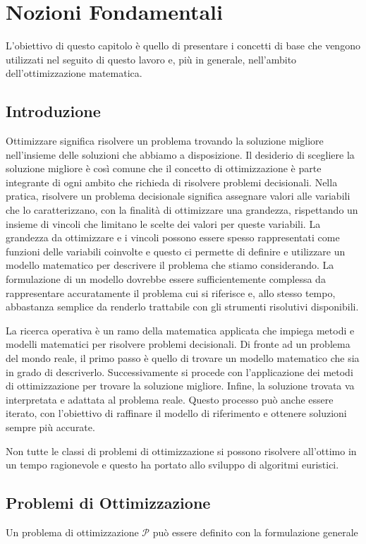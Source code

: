 \chapter{Nozioni Fondamentali}
L'obiettivo di questo capitolo è quello di presentare i concetti di base
che vengono utilizzati nel seguito di questo lavoro e, più in generale,
nell'ambito dell'ottimizzazione matematica.

\section{Introduzione}
Ottimizzare significa risolvere un problema trovando la soluzione migliore
nell'insieme delle soluzioni che abbiamo a disposizione. Il desiderio di
scegliere la soluzione migliore è così comune che il concetto di
ottimizzazione è parte integrante di ogni ambito che richieda di risolvere
problemi decisionali. Nella pratica, risolvere un problema decisionale
significa assegnare valori alle variabili che lo caratterizzano, con
la finalità di ottimizzare una grandezza, rispettando un insieme di
vincoli che limitano le scelte dei valori per queste variabili. La
grandezza da ottimizzare e i vincoli possono essere spesso
rappresentati come funzioni delle variabili coinvolte e questo ci permette
di definire e utilizzare un modello matematico per descrivere il problema che stiamo
considerando. La formulazione di un modello dovrebbe essere
sufficientemente complessa da rappresentare accuratamente il problema cui
si riferisce e, allo stesso tempo, abbastanza semplice da renderlo
trattabile con gli strumenti risolutivi disponibili.

La ricerca operativa è un ramo della matematica applicata che impiega
metodi e modelli matematici per risolvere problemi decisionali. Di fronte
ad un problema del mondo reale, il primo passo è quello di trovare un modello
matematico che sia in grado di descriverlo. Successivamente si procede con
l'applicazione dei metodi di ottimizzazione per trovare la soluzione
migliore. Infine, la soluzione trovata va interpretata e adattata al
problema reale. Questo processo può anche essere iterato, con l'obiettivo di
raffinare il modello di riferimento e ottenere
soluzioni sempre più accurate.

Non tutte le classi di problemi di ottimizzazione si possono risolvere
all'ottimo in un tempo ragionevole e questo ha portato allo sviluppo di
algoritmi euristici.

\section{Problemi di Ottimizzazione}
Un problema di ottimizzazione $\mathcal{P}$ può essere definito con la
formulazione generale

